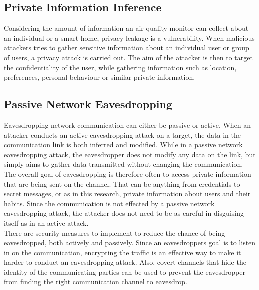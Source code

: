 \subsection*{Private Information Inference}
Considering the amount of information an air quality monitor can collect about an individual or a smart home, privacy leakage is a vulnerability. \cite{SecPrivSmartCity} When malicious attackers tries to gather sensitive information about an individual user or group of users, a privacy attack is carried out. \cite{CyberEntitySecInIoT} The aim of the attacker is then to target the confidentiality of the user, while gathering information such as location, preferences, personal behaviour or similar private information.

\subsection*{Passive Network Eavesdropping}
Eavesdropping network communication can either be passive or active. When an attacker conducts an active eavesdropping attack on a target, the data in the communication link is both inferred and modified. \cite{Eavesdropping} While in a passive network eavesdropping attack, the eavesdropper does not modify any data on the link, but simply aims to gather data transmitted without changing the communication. The overall goal of eavesdropping is therefore often to access private information that are being sent on the channel. That can be anything from credentials to secret messages, or as in this research, private information about users and their habits. \cite{Eavesdropping} Since the communication is not effected by a passive network eavesdropping attack, the attacker does not need to be as careful in disguising itself as in an active attack.  
\\
There are security measures to implement to reduce the chance of being eavesdropped, both actively and passively. Since an eavesdroppers goal is to listen in on the communication, encrypting the traffic is an effective way to make it harder to conduct an eavesdropping attack. Also, covert channels that hide the identity of the communicating parties can be used to prevent the eavesdropper from finding the right communication channel to eavesdrop. \cite{Eavesdropping}
\\\\
